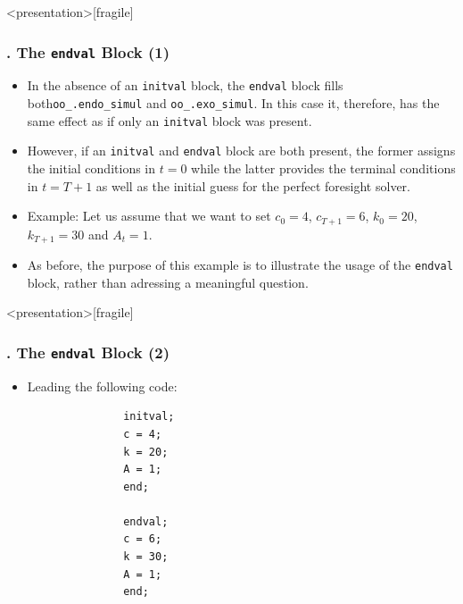 \documentclass[11pt,aspectratio=169]{beamer}
\begin{document}
\begin{frame}<presentation>[fragile]
	\frametitle{{\thesection.\thesubsection\thinspace\thesubsubsection} The \texttt{endval} Block (1)}
	\begin{itemize}
		\item In the absence of an \texttt{initval} block, the \texttt{endval} block fills both\linebreak \texttt{oo\_.endo\_simul} and \texttt{oo\_.exo\_simul}. In this case it, therefore, has the same effect as if only an \texttt{initval} block was present.
		\item However, if an \texttt{initval} and  \texttt{endval} block are both present, the former assigns the initial conditions in $t=0$ while the latter provides the terminal conditions in $t=T+1$ as well as the initial guess for the perfect foresight solver.
		\item Example: Let us assume that we want to set $c_0=4$, $c_{T+1}=6$, $k_0=20$, $k_{T+1}=30$ and $A_t=1$.
		\item As before, the purpose of this example is to illustrate the usage of the \texttt{endval} block, rather than adressing a meaningful question.
	\end{itemize}
\end{frame}
\begin{frame}<presentation>[fragile]
	\frametitle{{\thesection.\thesubsection\thinspace\thesubsubsection} The \texttt{endval} Block (2)}
	\begin{itemize}
		\item Leading the following code:
			\begin{verbatim}
			   initval;
			   c = 4;
			   k = 20;
			   A = 1;
			   end;

			   endval;
			   c = 6;
			   k = 30;
			   A = 1;
			   end;
			\end{verbatim}
	\end{itemize}
\end{frame}
\end{document}
